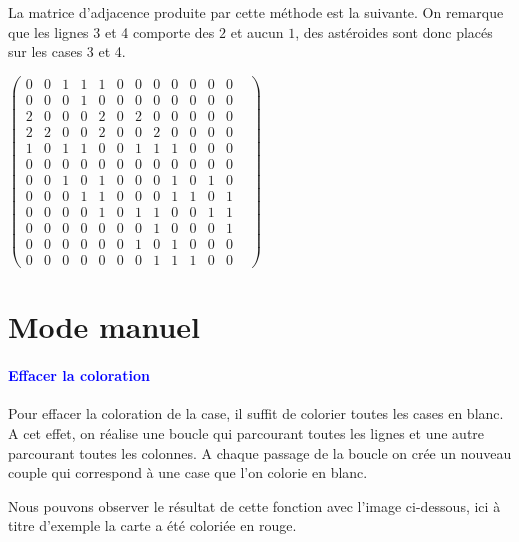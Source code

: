 \documentclass{report}
\begin{document}
			La matrice d'adjacence produite par cette méthode est la suivante. On remarque que les lignes 3 et 4 comporte des $2$ et aucun $1$, des astéroides sont donc placés sur les cases 3 et 4.
			\setcounter{MaxMatrixCols}{20}
			\\
			\begin{center}
			$\begin{pmatrix}
			0&0&1&1&1&0&0&0&0&0&0&0&\\
			0&0&0&1&0&0&0&0&0&0&0&0&\\
			2&0&0&0&2&0&2&0&0&0&0&0&\\
			2&2&0&0&2&0&0&2&0&0&0&0&\\
			1&0&1&1&0&0&1&1&1&0&0&0&\\
			0&0&0&0&0&0&0&0&0&0&0&0&\\
			0&0&1&0&1&0&0&0&1&0&1&0&\\
			0&0&0&1&1&0&0&0&1&1&0&1&\\
			0&0&0&0&1&0&1&1&0&0&1&1&\\
			0&0&0&0&0&0&0&1&0&0&0&1&\\
			0&0&0&0&0&0&1&0&1&0&0&0&\\
			0&0&0&0&0&0&0&1&1&1&0&0&
			\end{pmatrix}$	
			\end{center}
			
		\section{Mode manuel}
			      \paragraph{\textcolor{blue}{Effacer la coloration}} 
    Pour effacer la coloration de la case, il suffit de colorier toutes les cases en blanc. 
    A cet effet, on réalise une boucle qui parcourant toutes les lignes  et une autre parcourant toutes les colonnes. A chaque passage de la boucle on crée un nouveau couple qui correspond à une case que l'on colorie en blanc. %
       
      Nous pouvons observer le résultat de cette fonction avec l'image ci-dessous, ici à titre d'exemple la carte a été coloriée en rouge. 
       
\end{document}
